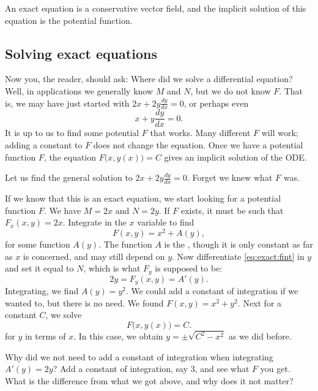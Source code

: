 \documentclass[12pt]{book}
\begin{document}
An exact equation is a conservative vector field, and the implicit
solution of this equation is the potential function.

\subsection{Solving exact equations}

Now you, the reader, should ask: Where did we solve a differential equation?
Well, in applications we generally know $M$ and $N$, but we do not
know $F$.  That is, we may have just started with
$2x + 2y \frac{dy}{dx} = 0$, or perhaps even
\begin{equation*}
x + y \frac{dy}{dx} = 0 .
\end{equation*}
It is up to us to find some potential $F$ that works.  Many different $F$
will work; adding a constant to $F$ does not change the equation.
Once we have a potential function $F$, the equation 
$F\bigl(x,y(x)\bigr) = C$
gives an implicit solution of the ODE.

\begin{example}
Let us find the general solution to
$2x + 2y \frac{dy}{dx} = 0$.  Forget we knew
what $F$ was.

If we know that this is an exact equation, we start looking for a potential
function $F$.
We have $M = 2x$ and $N=2y$.
If $F$ exists, it must be such that
$F_x (x,y) = 2x$.
Integrate in the $x$ variable to find
\begin{equation} \label{eq:exact:fint}
F(x,y) = x^2 + A(y) ,
\end{equation}
for some function $A(y)$.  The function $A$ is the , though it is only constant as far as $x$ is concerned, and
may still depend on $y$.  Now differentiate \eqref{eq:exact:fint} in $y$ 
and set it equal to $N$, which is what $F_y$ is supposed to be:
\begin{equation*}
2y = F_y (x,y) = A'(y) .
\end{equation*}
Integrating, we find $A(y) = y^2$.  We could add a constant of integration
if we wanted to, but there is no need.  We found $F(x,y) = x^2+y^2$.
Next for a constant $C$, we solve
\begin{equation*}
F\bigl(x,y(x)\bigr) = C .
\end{equation*}
for $y$ in terms of $x$.  In this case, we obtain $y = \pm \sqrt{C^2-x^2}$
as we did before.
\end{example}

\begin{exercise}
Why did we not need to add a constant of integration when integrating $A'(y)
= 2y$?  Add a constant of integration, say $3$, and see what $F$ you get.
What is the difference from what we got above, and why does it not matter?
\end{exercise}
\end{document}

